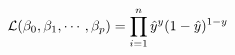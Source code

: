 \documentclass[preview]{standalone}
\begin{document}
\begin{align*}
\special{dvisvgm:raw <g id='unique000'>}\mathcal{L}(\beta_0, \beta_1, \cdots, \beta_p)=\prod^n_{i=1}\hat{y}^y(1-\hat{y})^{1-y}\special{dvisvgm:raw </g>}
\end{align*}
\end{document}

